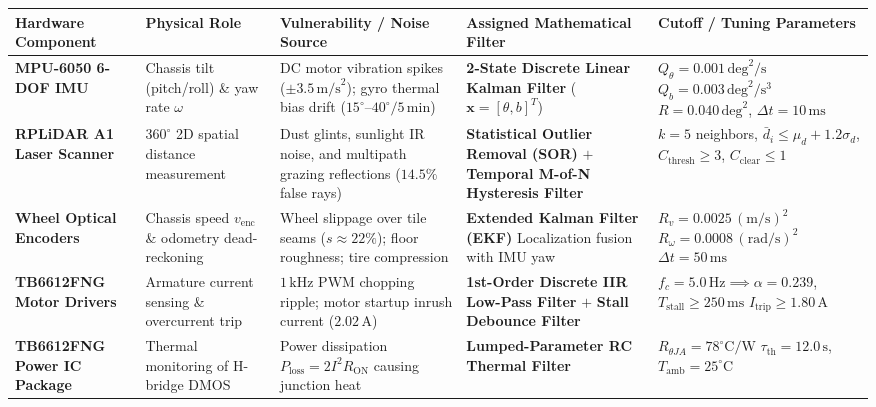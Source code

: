 \documentclass[11pt, a4paper]{article}
\begin{document}
\begin{table}[H]
\centering
\small
\begin{tabularx}{\textwidth}{L{2.5cm} L{2.5cm} L{3.5cm} L{3.5cm} Y}
\toprule
\textbf{Hardware Component} & \textbf{Physical Role} & \textbf{Vulnerability / Noise Source} & \textbf{Assigned Mathematical Filter} & \textbf{Cutoff / Tuning Parameters} \\
\midrule
\textbf{MPU-6050 6-DOF IMU} & Chassis tilt (pitch/roll) \& yaw rate $\omega$ & DC motor vibration spikes ($\pm 3.5\,\text{m/s}^2$); gyro thermal bias drift ($15^\circ\text{--}40^\circ / 5\,\text{min}$) & \textbf{2-State Discrete Linear Kalman Filter} ($\mathbf{x} = [\theta, b]^T$) & $Q_\theta = 0.001\,\text{deg}^2/\text{s}$ \newline $Q_b = 0.003\,\text{deg}^2/\text{s}^3$ \newline $R = 0.040\,\text{deg}^2$, $\Delta t = 10\,\text{ms}$ \\
\midrule
\textbf{RPLiDAR A1 Laser Scanner} & $360^\circ$ 2D spatial distance measurement & Dust glints, sunlight IR noise, and multipath grazing reflections ($14.5\%$ false rays) & \textbf{Statistical Outlier Removal (SOR)} $+$ \textbf{Temporal M-of-N Hysteresis Filter} & $k=5$ neighbors, \newline $\bar{d}_i \le \mu_d + 1.2\sigma_d$, \newline $C_{\text{thresh}} \ge 3$, $C_{\text{clear}} \le 1$ \\
\midrule
\textbf{Wheel Optical Encoders} & Chassis speed $v_{\text{enc}}$ \& odometry dead-reckoning & Wheel slippage over tile seams ($s \approx 22\%$); floor roughness; tire compression & \textbf{Extended Kalman Filter (EKF)} Localization fusion with IMU yaw & $R_v = 0.0025\,(\text{m/s})^2$ \newline $R_\omega = 0.0008\,(\text{rad/s})^2$ \newline $\Delta t = 50\,\text{ms}$ \\
\midrule
\textbf{TB6612FNG Motor Drivers} & Armature current sensing \& overcurrent trip & $1\,\text{kHz}$ PWM chopping ripple; motor startup inrush current ($2.02\,\text{A}$) & \textbf{1st-Order Discrete IIR Low-Pass Filter} $+$ \textbf{Stall Debounce Filter} & $f_c = 5.0\,\text{Hz} \implies \alpha = 0.239$, \newline $T_{\text{stall}} \ge 250\,\text{ms}$ \newline $I_{\text{trip}} \ge 1.80\,\text{A}$ \\
\midrule
\textbf{TB6612FNG Power IC Package} & Thermal monitoring of H-bridge DMOS & Power dissipation $P_{\text{loss}} = 2 I^2 R_{\text{ON}}$ causing junction heat & \textbf{Lumped-Parameter RC Thermal Filter} & $R_{\theta JA} = 78^\circ\text{C/W}$ \newline $\tau_{\text{th}} = 12.0\,\text{s}$, $T_{\text{amb}} = 25^\circ\text{C}$ \\

\end{tabularx}
\end{table}
\end{document}
